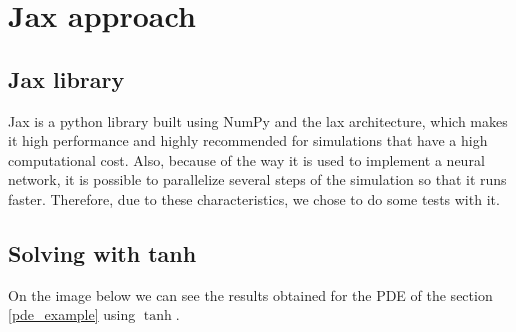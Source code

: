 \section{Jax approach}
\subsection{Jax library}
Jax is a python library built using NumPy and the lax architecture, which makes it high performance and highly recommended for simulations that have a high computational cost. Also, because of the way it is used to implement a neural network, it is possible to parallelize several steps of the simulation so that it runs faster.  
Therefore, due to these characteristics, we chose to do some tests with it.

\subsection{Solving with tanh}
On the image below we can see the results obtained for the PDE of the section \ref{pde_example} using $\tanh$.
